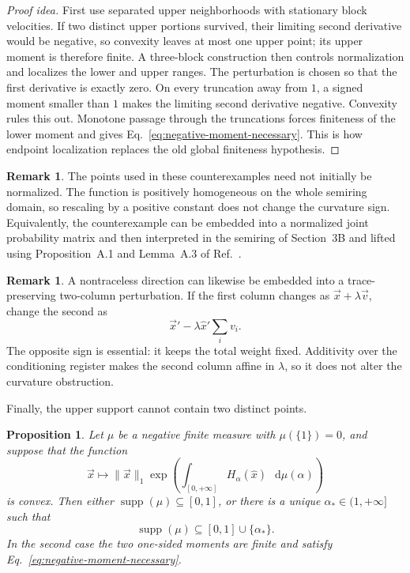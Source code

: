 \documentclass[11pt]{article}
\newtheorem{proposition}[theorem]{Proposition}
\theoremstyle{definition}
\newtheorem{remark}[theorem]{Remark}
\def\d{\mathop{}\!\mathrm{d}}
\begin{document}
\begin{proof}[Proof idea]
First use separated upper neighborhoods with stationary block velocities.  If
two distinct upper portions survived, their limiting second derivative would be
negative, so convexity leaves at most one upper point; its upper moment is
therefore finite.  A three-block construction then controls normalization and
localizes the lower and upper ranges.  The perturbation
is chosen so that the first derivative is exactly zero.  On every truncation away
from $1$, a signed moment smaller than $1$ makes the limiting second derivative
negative.  Convexity rules this out.  Monotone passage through the truncations
forces finiteness of the lower moment and gives
Eq.~\eqref{eq:negative-moment-necessary}.  This is how endpoint localization
replaces the old global finiteness hypothesis.
\end{proof}

\begin{remark}
The points used in these counterexamples need not initially be normalized.  The
function is positively homogeneous on the whole semiring domain, so rescaling by
a positive constant does not change the curvature sign.  Equivalently, the
counterexample can be embedded into a normalized joint probability matrix and
then interpreted in the semiring of Section~3B and lifted using
Proposition~A.1 and Lemma~A.3 of Ref.~\cite{rubboli2026complete}.
\end{remark}

\begin{remark}
A nontraceless direction can likewise be embedded into a trace-preserving
two-column perturbation.  If the first column changes as
$\vec{x}+\lambda\vec{v}$, change the second as
\begin{equation}
\vec{x}'-\lambda\hat{x}'\sum_i v_i.
\end{equation}
The opposite sign is essential: it keeps the total weight fixed.  Additivity over
the conditioning register makes the second column affine in $\lambda$, so it
does not alter the curvature obstruction.
\end{remark}

Finally, the upper support cannot contain two distinct points.

\begin{proposition}
\label{prop:third-measure}
Let $\mu$ be a negative finite measure with $\mu(\{1\})=0$, and suppose that the
function
\begin{equation}
\vec{x}\longmapsto\|\vec{x}\|_1
\exp\!\left(\int_{[0,+\infty]}H_\alpha(\hat{x})\,
\d\mu(\alpha)\right)
\end{equation}
is convex.  Then either $\operatorname{supp}(\mu)\subseteq[0,1]$, or there is a
unique $\alpha_*\in(1,+\infty]$ such that
\begin{equation}
\operatorname{supp}(\mu)\subseteq[0,1]\cup\{\alpha_*\}.
\end{equation}
In the second case the two one-sided moments are finite and satisfy
Eq.~\eqref{eq:negative-moment-necessary}.
\end{proposition}
\end{document}
